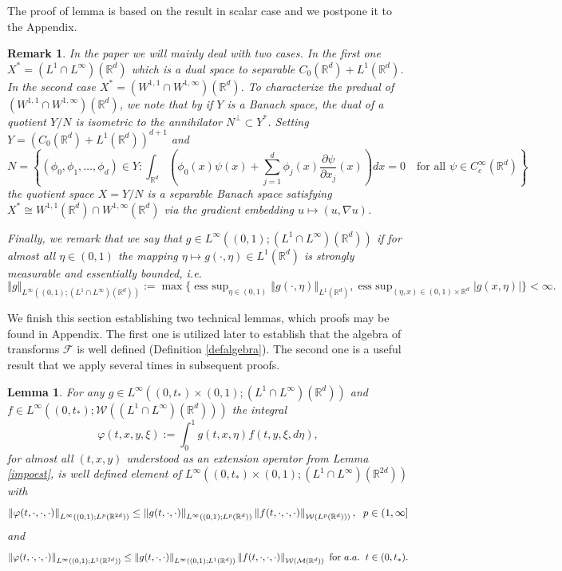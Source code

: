 \documentclass[10pt]{article}
\newtheorem{lemma}{Lemma}
\newtheorem{remark}{Remark}
\DeclareMathOperator*{\esssup}{ess~sup}
\newcommand{\eqq}[2]{\begin{equation}  #1  \label{#2}\end{equation}    }
\newcommand{\hd}{\hspace{0.2cm}}
\newcommand{\m}[1]{\mbox{#1}}
\newcommand*{\norm}[1]{\left\Vert{#1}\right\Vert}
\newcommand{\vf}{\varphi}
\newcommand{\R}{\mathbb{R}}
\newcommand{\izj}{\int_{0}^{1}}
\newcommand{\W}{\mathcal{W}}
\begin{document}
The proof of lemma is based on the result in scalar case and we postpone it to the Appendix. 


\begin{remark}
    In the paper we will mainly deal with two cases. In the first one $X^* = (L^{1}\cap L^{\infty})(\R^d)$ which is a dual space to separable $C_{0}(\R^d)+ L^{1}(\R^d)$. In the second case $X^*= (W^{1,1}\cap W^{1,\infty})(\R^d)$. To characterize the predual of  $(W^{1,1}\cap W^{1,\infty})(\R^d)$, we note that by \cite[Theorem 4.9]{Rudin}  if $Y$ is a Banach space, the dual of a quotient $Y / N$ is isometric to the annihilator $N^\perp \subset Y^*$. Setting $Y = (C_0(\mathbb{R}^d) + L^1(\mathbb{R}^d))^{d+1}$ and
    \[
    N = \left\{ (\phi_0, \phi_1, \dots, \phi_d) \in Y : \int_{\mathbb{R}^d} \left( \phi_0(x) \psi(x) + \sum_{j=1}^d \phi_j(x) \frac{\partial \psi}{\partial x_j}(x) \right) dx = 0 \quad \text{for all } \psi \in C_c^\infty(\mathbb{R}^d) \right\}
    \]
    the quotient space $X = Y / N$ is a separable Banach space satisfying $X^* \cong W^{1,1}(\mathbb{R}^d) \cap W^{1,\infty}(\mathbb{R}^d)$ via the gradient embedding $u \mapsto (u, \nabla u)$.
    
    
    Finally, we remark that we say that $g\in L^{\infty}((0,1);(L^1\cap L^{\infty})(\R^d))$ if for almost all $\eta \in (0,1)$ the mapping $\eta\mapsto g(\cdot,\eta) \in L^{1}(\R^d)$ is strongly measurable and essentially bounded, i.e.
\[
\norm{g}_{L^{\infty}( (0,1);(L^1\cap L^{\infty})(\R^d))}:= \max\{\esssup_{\eta \in  (0,1)}\norm{g(\cdot,\eta)}_{L^{1}(\R^d)}, \esssup_{(\eta,x) \in (0,1)\times \R^d}|g(x,\eta)| \} < \infty.
\]
\end{remark}

We finish this section establishing two technical lemmas, which proofs may be found in Appendix. The first one is utilized later to establish that the algebra of transforms $ \mathcal{F}$ is well defined (Definition \ref{defalgebra}). The second one is a useful result that we apply several times in subsequent proofs. 

\begin{lemma} \label{coro2}
For any $g \in L^{\infty}((0,t_{*})\times (0,1);(L^1\cap L^{\infty})(\R^d))$ and  $f \in L^{\infty}((0,t_{*});\W((L^1\cap L^{\infty})(\R^d)))$ the integral
\[
\vf(t,x,y,\xi):=\izj g(t,x,\eta)f(t,y,\xi,d\eta),
\]
for almost all $(t,x,y)$ understood as an extension operator from Lemma \ref{impoest}, is well defined element of $L^{\infty}((0,t_{*})\times (0,1);(L^1\cap L^{\infty})(\R^{2d}))$ with 
\eqq{
\norm{\vf(t,\cdot,\cdot,\cdot)}_{L^{\infty}( (0,1);L^{p}(\R^{2d}))}  \leq \norm{g(t,\cdot,\cdot)}_{L^{\infty}( (0,1);L^{p}(\R^{d}))} \norm{f(t,\cdot,\cdot,\cdot)}_{\W(L^{p}(\R^d)))}, \hd p \in (1,\infty]
}{coro2ei}
and
\eqq{
\norm{\vf(t,\cdot,\cdot,\cdot)}_{L^{\infty}((0,1);L^{1}(\R^{2d}))}  \leq \norm{g(t,\cdot,\cdot)}_{L^{\infty}((0,1);L^{1}(\R^{d}))} \norm{f(t,\cdot,\cdot,\cdot)}_{\W(\mathcal{M}(\R^d))} \m{ for } a.a.\hd t \in (0,t_{*}).
}{coro2ej}
\end{lemma}
\end{document}
